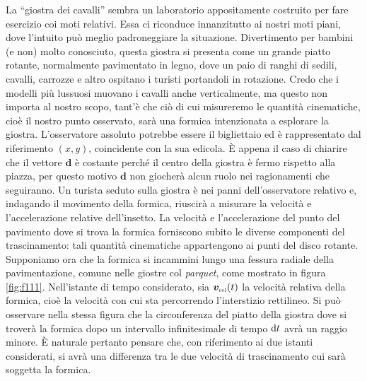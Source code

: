 \noindent La ``giostra dei cavalli'' sembra un laboratorio appositamente costruito per
fare esercizio coi moti relativi.
Essa ci riconduce innanzitutto ai nostri moti piani, dove l'intuito pu\`o meglio padroneggiare
la situazione.
Divertimento per bambini (e non) molto conosciuto, questa giostra si presenta come un grande
piatto rotante, normalmente pavimentato in legno, dove un paio di ranghi
di sedili, cavalli, carrozze e altro ospitano i turisti portandoli in rotazione. Credo che
i modelli pi\`u lussuosi muovano i cavalli anche verticalmente, ma questo non 
importa al nostro scopo, tant'\`e che ci\`o di cui misureremo le quantit\`a cinematiche,
cio\`e il nostro punto osservato, sar\`a una formica intenzionata a esplorare 
la giostra. L'osservatore assoluto potrebbe essere
il bigliettaio ed \`e rappresentato dal riferimento $(x,y)$, coincidente con la sua edicola.
\`E appena il caso di chiarire che il vettore
 ${\bm d}$ \`e costante perch\'e il centro della giostra
\`e fermo rispetto alla piazza, per questo motivo ${\bm d}$
non giocher\`a alcun ruolo nei ragionamenti che seguiranno.
Un turista seduto sulla giostra \`e nei panni dell'osservatore
relativo e, indagando il movimento della formica, riuscir\`a a misurare
la velocit\`a e l'accelerazione relative dell'insetto.
La velocit\`a e l'accelerazione del punto del pavimento dove si trova la formica
forniscono subito
le diverse componenti del trascinamento: tali quantit\`a cinematiche
appartengono ai punti del disco rotante.
Supponiamo ora che la formica si incammini lungo una fessura radiale
della pavimentazione, comune nelle giostre col {\em parquet}, come mostrato in figura \ref{fig:f111}.
Nell'istante di tempo considerato, sia ${{\bm v}_{\scriptscriptstyle{{\rm rel}}}}(t)$
la velocit\`a relativa della formica, cio\`e la velocit\`a con cui sta percorrendo l'interstizio
rettilineo. Si pu\`o osservare nella stessa figura che la circonferenza del
piatto della giostra dove si trover\`a la formica dopo un intervallo infinitesimale
di tempo ${\rm d}t$ avr\`a
un raggio minore. \`E naturale pertanto
pensare che, con riferimento ai due istanti considerati,
si avr\`a una differenza tra le due
velocit\`a di trascinamento cui sar\`a soggetta la formica.

